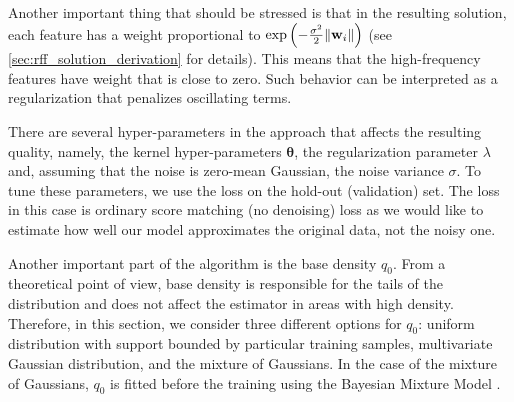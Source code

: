 Another important thing that should be stressed is that in the resulting solution,
each feature has a weight proportional to
$\exp \left ( -\frac{\sigma^2}{2} \|{\bf w}_i\| \right )$
(see \ref{sec:rff_solution_derivation} for details).
This means that the high-frequency features have weight that is close to zero.
Such behavior can be interpreted as a regularization that penalizes
oscillating terms.

There are several hyper-parameters in the approach that affects the resulting
quality, namely, the kernel hyper-parameters ${\bm \theta}$,
the regularization parameter $\lambda$ and,
assuming that the noise is zero-mean Gaussian, the noise variance $\sigma$.
To tune these parameters, we use the loss on the hold-out (validation) set.
The loss in this case is ordinary score matching (no denoising) loss as we would like to estimate
how well our model approximates the original data, not the noisy one.

Another important part of the algorithm is the base density $q_0$.
From a theoretical point of view, base density is responsible for the tails of the
distribution and does not affect the estimator in areas with high density.
Therefore, in this section, we consider three different options for $q_0$:
uniform distribution with support bounded by particular training samples,
multivariate Gaussian distribution, and the mixture of Gaussians.
In the case of the mixture of Gaussians, $q_0$ is fitted before the training using the Bayesian Mixture Model \cite{bishop}.

